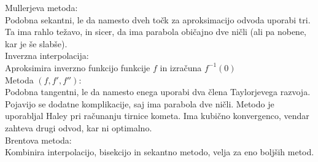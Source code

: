 \documentclass[a4paper]{article}
\begin{document}
Mullerjeva metoda: \\
Podobna sekantni, le da namesto dveh točk za aproksimacijo odvoda uporabi tri. Ta ima rahlo težavo, in sicer, da ima parabola običajno dve ničli (ali pa nobene, kar je še slabše). \\

Inverzna interpolacija: \\
Aproksimira inverzno funkcijo funkcije $f$ in izračuna $f^{-1}(0)$ \\

Metoda $(f, f', f'')$: \\
Podobna tangentni, le da namesto enega uporabi dva člena Taylorjevega razvoja. Pojavijo se dodatne komplikacije, saj ima parabola dve ničli. Metodo je uporabljal Haley pri
računanju tirnice kometa. Ima kubično konvergenco, vendar zahteva drugi odvod, kar ni optimalno. \\

Brentova metoda: \\
Kombinira interpolacijo, bisekcijo in sekantno metodo, velja za eno boljših metod.\\
\end{document}
